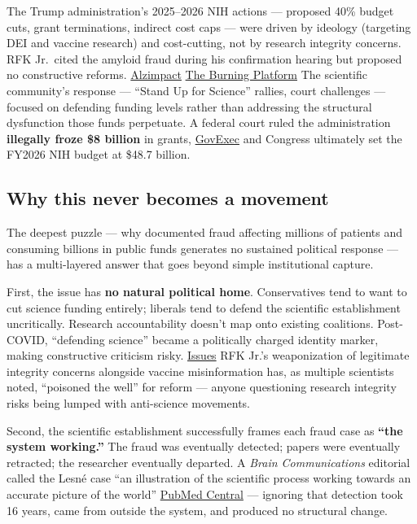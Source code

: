 The Trump administration's 2025--2026 NIH actions --- proposed 40\% budget cuts, grant terminations, indirect cost caps --- were driven by ideology (targeting DEI and vaccine research) and cost-cutting, not by research integrity concerns. RFK Jr.~cited the amyloid fraud during his confirmation hearing but proposed no constructive reforms. \href{https://alzimpact.org/Contrary-to-Clear-Verifiable-Facts-Secretary-Kennedy-Continues-to-Repeat-Harmful-Myths}{Alzimpact} \href{https://www.theburningplatform.com/2026/03/26/the-great-alzheimers-scam-and-the-proven-cures-theyve-buried-for-billions-2/}{The Burning Platform} The scientific community's response --- ``Stand Up for Science'' rallies, court challenges --- focused on defending funding levels rather than addressing the structural dysfunction those funds perpetuate. A federal court ruled the administration \textbf{illegally froze \$8 billion} in grants, \href{https://www.govexec.com/oversight/2025/08/trump-illegally-froze-1800-nih-medical-research-grants-congress-watchdog-says/407296/}{GovExec} and Congress ultimately set the FY2026 NIH budget at \$48.7 billion.

\subsection{Why this never becomes a movement}\label{19_200_billion-why-this-never-becomes-a-movement}

The deepest puzzle --- why documented fraud affecting millions of patients and consuming billions in public funds generates no sustained political response --- has a multi-layered answer that goes beyond simple institutional capture.

First, the issue has \textbf{no natural political home}. Conservatives tend to want to cut science funding entirely; liberals tend to defend the scientific establishment uncritically. Research accountability doesn't map onto existing coalitions. Post-COVID, ``defending science'' became a politically charged identity marker, making constructive criticism risky. \href{https://issues.org/new-politics-science-mills-st-clair/}{Issues} RFK Jr.'s weaponization of legitimate integrity concerns alongside vaccine misinformation has, as multiple scientists noted, ``poisoned the well'' for reform --- anyone questioning research integrity risks being lumped with anti-science movements.

Second, the scientific establishment successfully frames each fraud case as \textbf{``the system working.''} The fraud was eventually detected; papers were eventually retracted; the researcher eventually departed. A \emph{Brain Communications} editorial called the Lesné case ``an illustration of the scientific process working towards an accurate picture of the world'' \href{https://pmc.ncbi.nlm.nih.gov/articles/PMC9445174/}{PubMed Central} --- ignoring that detection took 16 years, came from outside the system, and produced no structural change.

